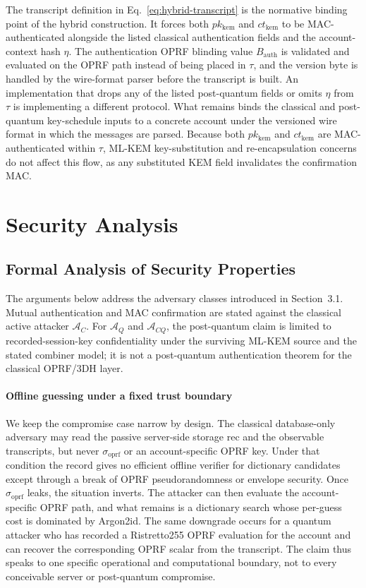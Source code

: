 \documentclass[preprint,12pt]{elsarticle}
\newcommand{\sigoprf}{\sigma_{\mathrm{oprf}}}
\theoremstyle{remark}
\begin{document}
The transcript definition in Eq.~\eqref{eq:hybrid-transcript} is the normative binding point of the hybrid construction. It forces both $pk_{\mathrm{kem}}$ and $ct_{\mathrm{kem}}$ to be MAC-authenticated alongside the listed classical authentication fields and the account-context hash $\eta$. The authentication OPRF blinding value $B_{\mathrm{auth}}$ is validated and evaluated on the OPRF path instead of being placed in $\tau$, and the version byte is handled by the wire-format parser before the transcript is built. An implementation that drops any of the listed post-quantum fields or omits $\eta$ from $\tau$ is implementing a different protocol. What remains binds the classical and post-quantum key-schedule inputs to a concrete account under the versioned wire format in which the messages are parsed. Because both $pk_{\mathrm{kem}}$ and $ct_{\mathrm{kem}}$ are MAC-authenticated within $\tau$, ML-KEM key-substitution and re-encapsulation concerns do not affect this flow, as any substituted KEM field invalidates the confirmation MAC.

\section{Security Analysis}

\subsection{Formal Analysis of Security Properties}

The arguments below address the adversary classes introduced in
Section~3.1. Mutual authentication and MAC confirmation are stated against
the classical active attacker $\mathcal{A}_C$. For $\mathcal{A}_Q$ and
$\mathcal{A}_{CQ}$, the post-quantum claim is limited to recorded-session-key
confidentiality under the surviving ML-KEM source and the stated combiner
model; it is not a post-quantum authentication theorem for the classical
OPRF/3DH layer.

\paragraph{Offline guessing under a fixed trust boundary}
We keep the compromise case narrow by design. The classical database-only
adversary may read the passive server-side storage $\mathrm{rec}$ and the
observable transcripts, but never $\sigoprf$ or an account-specific OPRF
key. Under that condition the record gives no efficient offline verifier
for dictionary candidates except through a break of OPRF pseudorandomness or
envelope security. Once $\sigoprf$ leaks, the situation inverts. The
attacker can then evaluate the account-specific OPRF path, and what remains
is a dictionary search whose per-guess cost is dominated by Argon2id. The
same downgrade occurs for a quantum attacker who has recorded a Ristretto255
OPRF evaluation for the account and can recover the corresponding OPRF
scalar from the transcript. The claim thus speaks to one specific
operational and computational boundary, not to every conceivable server or
post-quantum compromise.
\end{document}
